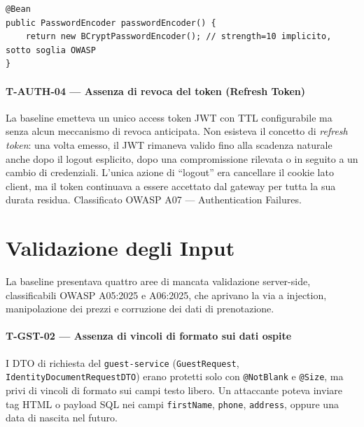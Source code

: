 ﻿\documentclass[a4paper,12pt]{report}
\begin{document}
\begin{insecurebox}[title={SecurityConfig.java --- cost factor 10 implicito (baseline)}]
\begin{lstlisting}[style=java]
@Bean
public PasswordEncoder passwordEncoder() {
    return new BCryptPasswordEncoder(); // strength=10 implicito, sotto soglia OWASP
}
\end{lstlisting}
\end{insecurebox}

\paragraph{T-AUTH-04 — Assenza di revoca del token (Refresh Token)}
La baseline emetteva un unico access token JWT con TTL configurabile ma senza alcun
meccanismo di revoca anticipata. Non esisteva il concetto di \emph{refresh token}: una volta
emesso, il JWT rimaneva valido fino alla scadenza naturale anche dopo il logout esplicito,
dopo una compromissione rilevata o in seguito a un cambio di credenziali.
L'unica azione di ``logout'' era cancellare il cookie lato client, ma il token continuava
a essere accettato dal gateway per tutta la sua durata residua.
Classificato OWASP A07 --- Authentication Failures.

\section{Validazione degli Input}

La baseline presentava quattro aree di mancata validazione server-side, classificabili
OWASP A05:2025 e A06:2025, che aprivano la via a injection, manipolazione dei prezzi e
corruzione dei dati di prenotazione.

\paragraph{T-GST-02 — Assenza di vincoli di formato sui dati ospite}
I DTO di richiesta del \texttt{guest-service} (\texttt{GuestRequest},
\texttt{IdentityDocumentRequestDTO}) erano protetti solo con \texttt{@NotBlank} e
\texttt{@Size}, ma privi di vincoli di formato sui campi testo libero.
Un attaccante poteva inviare tag HTML o payload SQL nei campi \texttt{firstName},
\texttt{phone}, \texttt{address}, oppure una data di nascita nel futuro.
\end{document}
